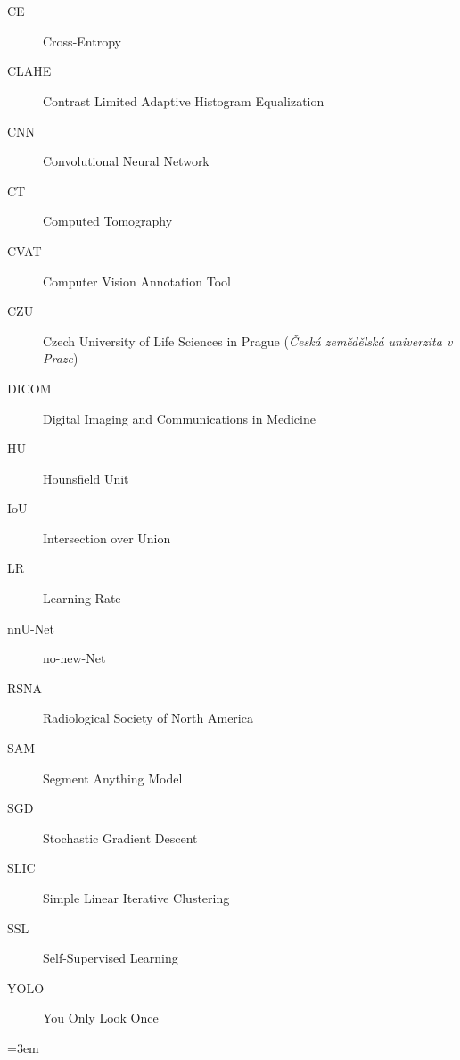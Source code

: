 \documentclass[english,bachelor,oneside]{ctufit-thesis}
\begin{document}
\tableofcontents %
\listoffigures %
\begingroup
\let\clearpage\relax
\listoftables %
\endgroup

\chapter{\thectufitabbreviationlabel}

\begin{description}
    \item[CE] Cross-Entropy
    \item[CLAHE] Contrast Limited Adaptive Histogram Equalization
    \item[CNN] Convolutional Neural Network
    \item[CT] Computed Tomography
    \item[CVAT] Computer Vision Annotation Tool
    \item[CZU] Czech University of Life Sciences in Prague (\textit{Česká zemědělská univerzita v Praze})
    \item[DICOM] Digital Imaging and Communications in Medicine
    \item[HU] Hounsfield Unit
    \item[IoU] Intersection over Union
    \item[LR] Learning Rate
    \item[nnU-Net] no-new-Net
    \item[RSNA] Radiological Society of North America
    \item[SAM] Segment Anything Model
    \item[SGD] Stochastic Gradient Descent
    \item[SLIC] Simple Linear Iterative Clustering
    \item[SSL] Self-Supervised Learning
    \item[YOLO] You Only Look Once
\end{description}
\resumeTOCentries
\mainmatter\mainmatterinit %

\sloppy


\appendix\appendixinit %


\backmatter %

\begingroup
\sloppy
\emergencystretch=3em
\printbibliography
\endgroup


\end{document}

